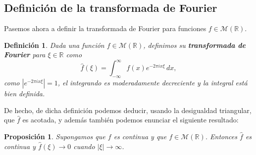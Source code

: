 \documentclass[12pt]{article}
\newcommand{\R}{\mathbb{R}}
\theoremstyle{plain}
\newtheorem{proposicion}[teorema]{Proposición}
\newtheorem{definicion}[teorema]{\textbf{Definición}}
\theoremstyle{definition}
\numberwithin{equation}{section}
\begin{document}
        \subsection{Definición de la transformada de Fourier}
            Pasemos ahora a definir la transformada de Fourier para funciones \(f \in \mathcal{M}(\R)\).
            \begin{definicion}
                \label{trans}
                Dada una función \(f \in \mathcal{M}(\R)\), definimos su \textbf{transformada de Fourier} para \(\xi \in \R\) como
                $$ \hat{f}(\xi) = \int_{-\infty}^{\infty} f(x)e^{-2\pi ix\xi}\,dx, $$ como \(\left\lvert e^{-2\pi ix\xi} \right\rvert = 1\), el integrando es moderadamente decreciente y la integral está bien definida.
            \end{definicion}
            De hecho, de dicha definición podemos deducir, usando la desigualdad triangular, que \(\hat{f}\) es acotada, y además también podemos enunciar el siguiente resultado:
            \begin{proposicion}
                Supongamos que \(f\) es continua y que \(f \in \mathcal{M}(\R)\). Entonces \(\hat{f}\) es continua y \(\hat{f}(\xi) \to 0\) cuando \(\left\lvert \xi\right\rvert \to \infty\).
            \end{proposicion}
\end{document}
